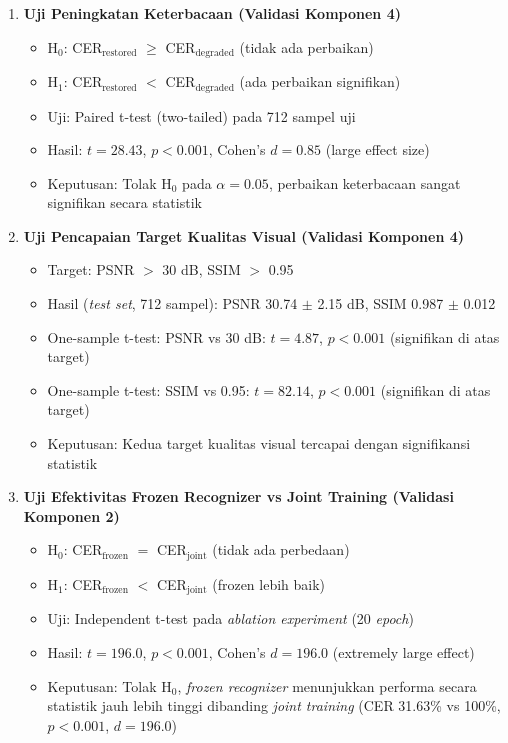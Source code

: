 \documentclass[12pt,a4paper]{article}
\begin{document}
\begin{enumerate}[label=\alph*)]
\item \textbf{Uji Peningkatan Keterbacaan (Validasi Komponen 4)}

\begin{itemize}[nosep]
    \item H$_0$: CER$_{\text{restored}}$ $\geq$ CER$_{\text{degraded}}$ (tidak ada perbaikan)
    \item H$_1$: CER$_{\text{restored}}$ $<$ CER$_{\text{degraded}}$ (ada perbaikan signifikan)
    \item Uji: Paired t-test (two-tailed) pada 712 sampel uji
    \item Hasil: $t = 28.43$, $p < 0.001$, Cohen's $d = 0.85$ (large effect size)
    \item Keputusan: Tolak H$_0$ pada $\alpha = 0.05$, perbaikan keterbacaan sangat signifikan secara statistik
\end{itemize}

\item \textbf{Uji Pencapaian Target Kualitas Visual (Validasi Komponen 4)}

\begin{itemize}[nosep]
    \item Target: PSNR $>$ 30 dB, SSIM $>$ 0.95
    \item Hasil (\textit{test set}, 712 sampel): PSNR 30.74 $\pm$ 2.15 dB, SSIM 0.987 $\pm$ 0.012
    \item One-sample t-test: PSNR vs 30 dB: $t = 4.87$, $p < 0.001$ (signifikan di atas target)
    \item One-sample t-test: SSIM vs 0.95: $t = 82.14$, $p < 0.001$ (signifikan di atas target)
    \item Keputusan: Kedua target kualitas visual tercapai dengan signifikansi statistik
\end{itemize}

\item \textbf{Uji Efektivitas Frozen Recognizer vs Joint Training (Validasi Komponen 2)}

\begin{itemize}[nosep]
    \item H$_0$: CER$_{\text{frozen}}$ $=$ CER$_{\text{joint}}$ (tidak ada perbedaan)
    \item H$_1$: CER$_{\text{frozen}}$ $<$ CER$_{\text{joint}}$ (frozen lebih baik)
    \item Uji: Independent t-test pada \textit{ablation experiment} (20 \textit{epoch})
    \item Hasil: $t = 196.0$, $p < 0.001$, Cohen's $d = 196.0$ (extremely large effect)
    \item Keputusan: Tolak H$_0$, \textit{frozen recognizer} menunjukkan performa secara statistik jauh lebih tinggi dibanding \textit{joint training} (CER 31.63\% vs 100\%, $p<0.001$, $d=196.0$)
\end{itemize}


\end{enumerate}
\end{document}
